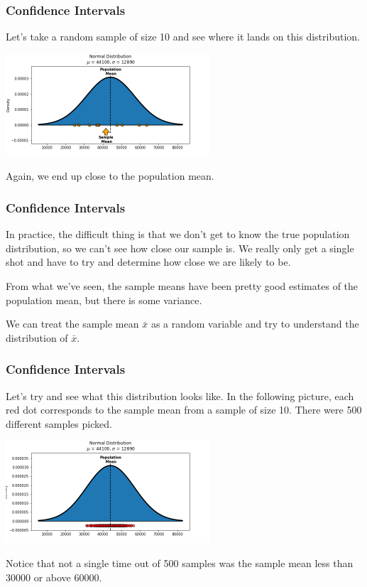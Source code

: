 \documentclass[11pt, table]{beamer}
\begin{document}
\begin{frame}
\frametitle{Confidence Intervals}
Let's take a random sample of size 10 and see where it lands on this distribution.
\begin{center}
\includegraphics[width = 3in]{images/sample_plot_4.png}
\end{center}
Again, we end up close to the population mean.
\end{frame}

\begin{frame}
\frametitle{Confidence Intervals}
In practice, the difficult thing is that we don't get to know the true population distribution, so we can't see how close our sample is. We really only get a single shot and have to try and determine how close we are likely to be.
\vspace{0.2in}

From what we've seen, the sample means have been pretty good estimates of the population mean, but there is some variance.
\vspace{0.2in}

We can treat the sample mean $\bar{x}$ as a random variable and try to understand the distribution of $\bar{x}$.

\end{frame}

\begin{frame}
\frametitle{Confidence Intervals}
Let's try and see what this distribution looks like. In the following picture, each red dot corresponds to the sample mean from a sample of size 10. There were 500 different samples picked.

\begin{center}
\includegraphics[width = 3in]{images/sampling_distribution.png}
\end{center}

Notice that not a single time out of 500 samples was the sample mean less than 30000 or above 60000.
\end{frame}
\end{document}
